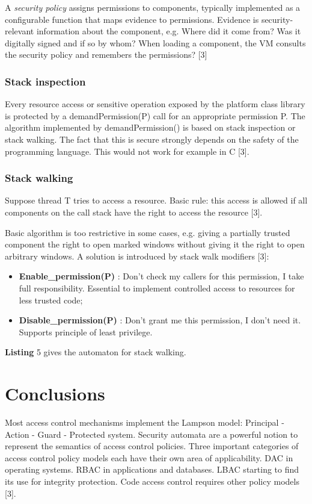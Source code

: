 A \emph{security policy} assigns permissions to components, typically implemented as a configurable function that maps evidence to permissions. Evidence is security-relevant information about the component, e.g. Where did it come from? Was it digitally signed and if so by whom? When loading a component, the VM consults the security policy and remembers the permissions? [3]


\subsubsection{Stack inspection}

Every resource access or sensitive operation exposed by the platform class library is protected by a demandPermission(P) call for an appropriate permission P. The algorithm implemented by demandPermission() is based on stack inspection or stack walking. The fact that this is secure strongly depends on the safety of the programming language. This would not work for example in C [3].

\subsubsection{Stack walking}

Suppose thread T tries to access a resource. Basic rule: this access is allowed if all components on the call stack have the right to access the resource [3].

Basic algorithm is too restrictive in some cases, e.g. giving a partially trusted component the right to open marked windows without giving it the right to open arbitrary windows. A solution is introduced by stack walk modifiers [3]:
\begin{itemize}
	\item \textbf{Enable\_permission(P)} : Don't check my callers for this permission, I take full responsibility. Essential to implement controlled access to resources for less trusted code;
	\item \textbf{Disable\_permission(P)} : Don't grant me this permission, I don't need it. Supports principle of least privilege.
\end{itemize}


\textbf{Listing} 5 gives the automaton for stack walking.



\section{Conclusions}

Most access control mechanisms implement the Lampson model: Principal - Action - Guard - Protected system. Security automata are a powerful notion to represent the semantics of access control policies. Three important categories of access control policy models each have their own area of applicability. DAC in operating systems. RBAC in applications and databases. LBAC starting to find its use for integrity protection. Code access control requires other policy models [3].


